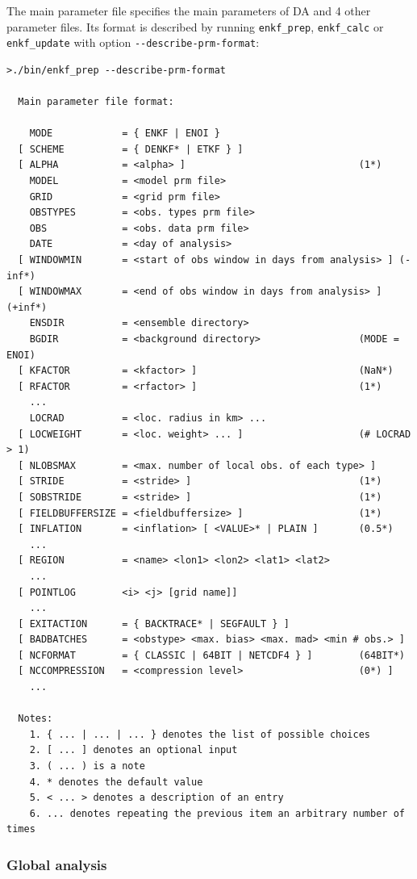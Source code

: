 \documentclass[11pt]{report}
\begin{document}
The main parameter file specifies the main parameters of DA and 4 other parameter files.
Its format is described by running \verb|enkf_prep|, \verb|enkf_calc| or \verb|enkf_update| with option \verb|--describe-prm-format|:
\begin{Verbatim}[frame=single,fontsize=\footnotesize]
>./bin/enkf_prep --describe-prm-format

  Main parameter file format:

    MODE            = { ENKF | ENOI }
  [ SCHEME          = { DENKF* | ETKF } ]
  [ ALPHA           = <alpha> ]                              (1*)
    MODEL           = <model prm file>
    GRID            = <grid prm file>
    OBSTYPES        = <obs. types prm file>
    OBS             = <obs. data prm file>
    DATE            = <day of analysis>
  [ WINDOWMIN       = <start of obs window in days from analysis> ] (-inf*)
  [ WINDOWMAX       = <end of obs window in days from analysis> ]   (+inf*)
    ENSDIR          = <ensemble directory>
    BGDIR           = <background directory>                 (MODE = ENOI)
  [ KFACTOR         = <kfactor> ]                            (NaN*)
  [ RFACTOR         = <rfactor> ]                            (1*)
    ...
    LOCRAD          = <loc. radius in km> ...
  [ LOCWEIGHT       = <loc. weight> ... ]                    (# LOCRAD > 1)
  [ NLOBSMAX        = <max. number of local obs. of each type> ]
  [ STRIDE          = <stride> ]                             (1*)
  [ SOBSTRIDE       = <stride> ]                             (1*)
  [ FIELDBUFFERSIZE = <fieldbuffersize> ]                    (1*)
  [ INFLATION       = <inflation> [ <VALUE>* | PLAIN ]       (0.5*)
    ...
  [ REGION          = <name> <lon1> <lon2> <lat1> <lat2>
    ...
  [ POINTLOG        <i> <j> [grid name]]
    ...
  [ EXITACTION      = { BACKTRACE* | SEGFAULT } ]
  [ BADBATCHES      = <obstype> <max. bias> <max. mad> <min # obs.> ]
  [ NCFORMAT        = { CLASSIC | 64BIT | NETCDF4 } ]        (64BIT*)
  [ NCCOMPRESSION   = <compression level>                    (0*) ]
    ...

  Notes:
    1. { ... | ... | ... } denotes the list of possible choices
    2. [ ... ] denotes an optional input
    3. ( ... ) is a note
    4. * denotes the default value
    5. < ... > denotes a description of an entry
    6. ... denotes repeating the previous item an arbitrary number of times
\end{Verbatim}

\subsubsection{Global analysis}
\end{document}
